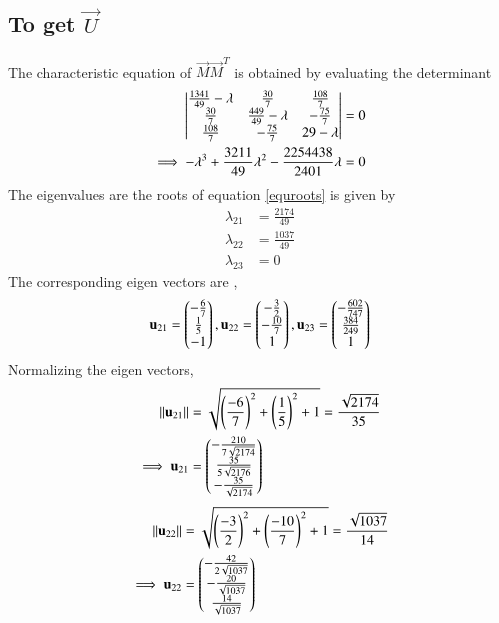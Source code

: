 \documentclass[journal,12pt,twocolumn]{IEEEtran}
\begin{document}
\subsection{To get $\vec{U}$ }
The characteristic equation of $\vec{M}\vec{M}^T$ is obtained by evaluating the determinant 
\begin{align}
    \begin{vmatrix}\frac{1341}{49} - \lambda & \frac{30}{7} & \frac{108}{7}\\ \frac{30}{7} & \frac{449}{49} - \lambda & -\frac{75}{7} \\ \frac{108}{7} & -\frac{75}{7} & 29 - \lambda\end{vmatrix} &= 0\\
	\implies -\lambda^3 + \frac{3211}{49}\lambda^2 - \frac{2254438}{2401} \lambda &=0 \label{equroots}
\end{align}
The eigenvalues are the roots of equation \ref{equroots} is given by 
\begin{align}
	\lambda_{21}&= \frac{2174}{49} \label{eqeig1}\\
	\lambda_{22}&= \frac{1037}{49}\label{eqeig2}\\
	\lambda_{23}&=0
\end{align}
The corresponding eigen vectors are , 
\begin{align}
	\mathbf{u}_{21}=\begin{pmatrix}-\frac{6}{7}\\ \frac{1}{5}\\ -1\end{pmatrix},
	\mathbf{u}_{22}=\begin{pmatrix}-\frac{3}{2}\\ -\frac{10}{7}\\1\end{pmatrix},
	\mathbf{u}_{23}=\begin{pmatrix}-\frac{602}{747} \\ \frac{384}{249} \\ 1\end{pmatrix}
\end{align}
Normalizing the eigen vectors, 
\begin{align}
	\left\lVert\mathbf{u}_{21}\right\rVert &=\sqrt{\left(\frac{-6}{7}\right)^2+\left(\frac{1}{5}\right)^2+1} =\frac{\sqrt{2174}}{35}\\
	\implies \mathbf{u}_{21} &=\begin{pmatrix}-\frac{210}{7 \sqrt{2174}} \\ \frac{35}{5 \sqrt{2176}} \\ -\frac{35}{\sqrt{2174}}\end{pmatrix}
\end{align}
\begin{align}
	\left\lVert\mathbf{u}_{22}\right\rVert&=\sqrt{\left(\frac{-3}{2}\right)^2+\left(\frac{-10}{7}\right)^2+1}=\frac{\sqrt{1037}}{14}\\
	\implies \mathbf{u}_{22}&=\begin{pmatrix}-\frac{42}{2\sqrt{1037}} \\ -\frac{20}{\sqrt{1037}} \\ \frac{14}{\sqrt{1037}}\end{pmatrix}
\end{align}
\end{document}
